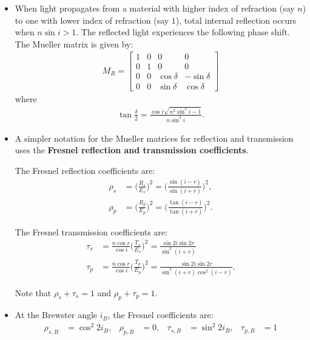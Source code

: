 \documentclass[10pt]{article}
\begin{document}
\begin{itemize}
		\item When light propagates from a material with higher index of refraction (say $n$) to one with lower index of refraction (say $1$),  total internal reflection occurs when $n \sin i > 1$.  The reflected light experiences the following phase shift.  The Mueller matrix is given by:
		\begin{align*}
			M_R = \begin{bmatrix}
				1 & 0 & 0 & 0 \\
				0 & 1 & 0 & 0 \\
				0 & 0 & \cos\delta & -\sin\delta \\
				0 & 0 & \sin\delta & \cos\delta
			\end{bmatrix}			
		\end{align*}
		where
		\begin{align*}
			\tan \frac{\delta}{2} = \frac{\cos i \sqrt{n^2 \sin^2 i - 1}}{n \sin^2 i}.
		\end{align*}

		\item A simpler notation for the Mueller matrices for reflection and transmission uses the \textbf{Fresnel reflection and transmission coefficients}.  

		The Fresnel reflection coefficients are:
		\begin{align*}
			\rho_s &= \bigg( \frac{R_s}{E_s} \bigg)^2 = \bigg( \frac{\sin (i-r)}{\sin (i+r)} \bigg)^2, \\
			\rho_p & = \bigg( \frac{R_p}{E_p} \bigg)^2 = \bigg( \frac{\tan (i-r)}{\tan (i+r)} \bigg)^2.
		\end{align*}

		The Fresnel transmission coefficients are:
		\begin{align*}
			\tau_s &= \frac{n \cos r}{\cos i} \bigg( \frac{T_s}{E_s} \bigg)^2 = \frac{\sin 2i \sin 2r}{\sin^2(i+r)} \\			
			\tau_p &= \frac{n \cos r}{\cos i} \bigg( \frac{T_p}{E_p} \bigg)^2 = \frac{\sin 2i \sin 2r}{\sin^2 (i+r) \cos^2 (i-r)}.
		\end{align*}

		Note that $\rho_s + \tau_s = 1$ and $\rho_p + \tau_p = 1$.

		\item At the Brewster angle $i_B$, the Fresnel coefficients are:
		\begin{align*}
			\rho_{s,B} &= \cos^2 2i_B, &
			\rho_{p,B} &= 0, &
			\tau_{s,B} &= \sin^2 2i_B, &
			\tau_{p,B} &= 1 
		\end{align*}


\end{itemize}
\end{document}
